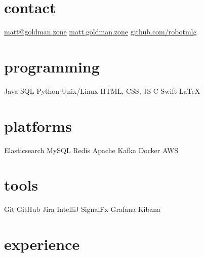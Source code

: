 \documentclass[]{friggeri-mlg-cv} %
\begin{document}


\begin{aside} %
\section{contact}
\href{mailto:matt@goldman.zone}{matt@goldman.zone}
\href{https://matt.goldman.zone}{matt.goldman.zone}
\href{https://github.com/robotmlg}{github.com/robotmlg}
\section{programming}
Java
SQL
Python
Unix/Linux
HTML, CSS, JS
C
Swift
\LaTeX
\section{platforms}
Elasticsearch
MySQL
Redis
Apache Kafka
Docker
AWS
\section{tools}
Git
GitHub
Jira
IntelliJ
SignalFx
Grafana
Kibana
\end{aside}



\section{experience}
\end{document}

